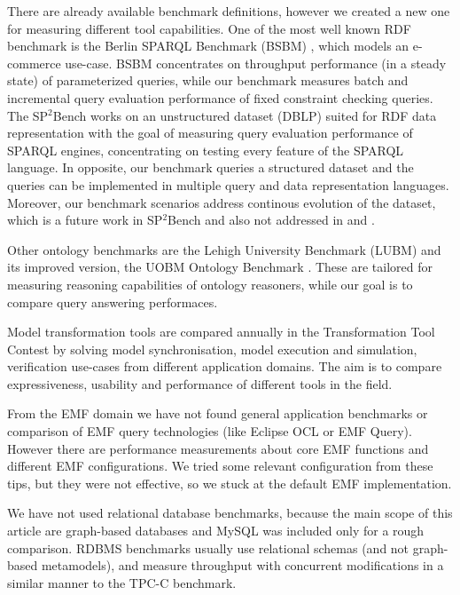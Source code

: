 There are already available benchmark definitions, however we created a new one
for measuring different tool capabilities. One of the most well known RDF
benchmark is the Berlin SPARQL Benchmark (BSBM) \cite{BerlinBenchmark}, which
models an e-commerce use-case. BSBM concentrates on throughput performance (in a
steady state) of parameterized queries, while our benchmark measures batch and
incremental query evaluation performance of fixed constraint checking queries.
The SP$^2$Bench \cite{SP2Bench} works on an unstructured dataset (DBLP) suited
for RDF data representation with the goal of measuring query evaluation
performance of SPARQL engines, concentrating on testing every feature of the
SPARQL language. In opposite, our benchmark queries a structured dataset and 
the queries can be implemented in multiple query and data representation languages.
Moreover, our benchmark scenarios address continous evolution of the dataset,
which is a future work in SP$^2$Bench and also not addressed in \cite{SIB} and
\cite{DBpediaSparql}.

Other ontology benchmarks are the Lehigh University Benchmark (LUBM)
\cite{LUBMBenchmark} and its improved version, the UOBM Ontology Benchmark
\cite{UOBM}. These are tailored for measuring reasoning capabilities of ontology
reasoners, while our goal is to compare query answering performaces.

Model transformation tools are compared annually in the Transformation Tool
Contest \cite{TTC} by solving model synchronisation, model execution and
simulation, verification use-cases from different application domains. The aim
is to compare expressiveness, usability and performance of different
tools in the field. 

From the EMF domain we have not found general application benchmarks or
comparison of EMF query technologies (like Eclipse OCL or EMF Query). However
there are performance measurements \cite{EMF-performance} about core EMF
functions and different EMF configurations. We tried some relevant
configuration from these tips, but they were not effective, so we stuck at the
default EMF implementation.

We have not used relational database benchmarks, because the main scope of this
article are graph-based databases and MySQL was included only for a rough
comparison. RDBMS benchmarks usually use relational schemas (and not graph-based
metamodels), and measure throughput with concurrent modifications in a similar manner 
to the TPC-C \cite{tpc-c} benchmark.

